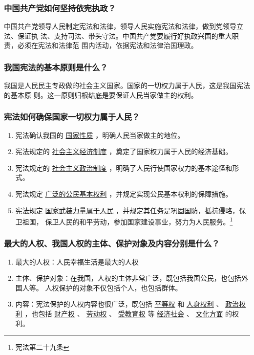 \documentclass[11pt]{article}
\begin{document}
\subsubsection{中国共产党如何坚持依宪执政？}
\label{sec:org53948b9}
中国共产党领导人民制定宪法和法律，领导人民实施宪法和法律，做到党领导立法、保证执
法、支持司法、带头守法。中国共产党要履行好执政兴国的重大职责，必须在宪法和法律范
围内活动，依据宪法和法律治国理政。
\subsubsection{我国宪法的基本原则是什么？}
\label{sec:orga5b38a0}
我国是人民民主专政做的社会主义国家。国家的一切权力属于人民，这是我国宪法的基本原
则。这一原则归根结底是要保证人民当家做主的权利。
\subsubsection{宪法如何确保国家一切权力属于人民？}
\label{sec:org9d1e1d2}
\begin{enumerate}
\item 宪法确认我国的 \uline{国家性质} ，明确人民当家做主的地位。
\item 宪法规定的 \uline{社会主义经济制度} ，奠定了国家权力属于人民的经济基础。
\item 宪法规定的 \uline{社会主义政治制度} ，明确了人民行使国家权力的基本途径和形式。
\item 宪法规定 \uline{广泛的公民基本权利} ，并规定实现公民基本权利的保障措施。
\item 宪法规定 \uline{国家武装力量属于人民} ，并规定其任务是巩固国防，抵抗侵略，保卫祖国，
保卫人民的和平劳动，参加国家建设事业，努力为人民服务。\footnote{宪法第二十九条}
\end{enumerate}
\subsubsection{最大的人权、我国人权的主体、保护对象及内容分别是什么？}
\label{sec:org396d3ab}
\begin{enumerate}
\item 最大的人权：人民幸福生活是最大的人权
\item 主体、保护对象：在我国，人权的主体非常广泛，既包括我国公民，也包括外国人等。
人权保护的对象不仅包括个人，也包括群体。
\item 内容：宪法保护的人权内容也很广泛，既包括 \uline{平等权} 和 \uline{人身权利} 、 \uline{政治权利}
，也包括 \uline{财产权} 、 \uline{劳动权} 、 \uline{受教育权} 等 \uline{经济社会} 、 \uline{文化方面} 的权
利。
\end{enumerate}
\end{document}
